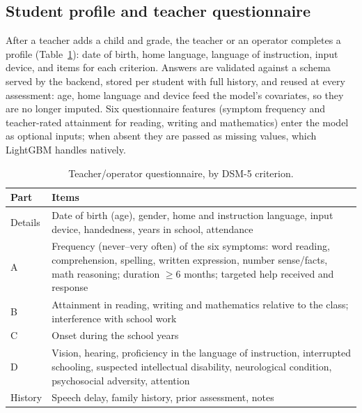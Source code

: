 \documentclass[conference]{IEEEtran}
\begin{document}
\subsection{Student profile and teacher questionnaire}
After a teacher adds a child and grade, the teacher or an operator completes a
profile (Table~\ref{tab:questionnaire}): date of birth, home language, language of
instruction, input device, and items for each criterion. Answers are validated against
a schema served by the backend, stored per student with full history, and reused at
every assessment: age, home language and device feed the model's covariates, so they
are no longer imputed. Six questionnaire features (symptom frequency and teacher-rated
attainment for reading, writing and mathematics) enter the model as optional inputs;
when absent they are passed as missing values, which LightGBM handles natively.

\begin{table}[!t]
\centering
\caption{Teacher/operator questionnaire, by DSM-5 criterion.}
\label{tab:questionnaire}
\footnotesize
\setlength{\tabcolsep}{3pt}
\begin{tabular}{@{}lp{6.6cm}@{}}
\toprule
Part & Items \\
\midrule
Details & Date of birth (age), gender, home and instruction language, input device, handedness, years in school, attendance \\
A & Frequency (never--very often) of the six symptoms: word reading, comprehension, spelling, written expression, number sense/facts, math reasoning; duration $\geq$6 months; targeted help received and response \\
B & Attainment in reading, writing and mathematics relative to the class; interference with school work \\
C & Onset during the school years \\
D & Vision, hearing, proficiency in the language of instruction, interrupted schooling, suspected intellectual disability, neurological condition, psychosocial adversity, attention \\
History & Speech delay, family history, prior assessment, notes \\
\bottomrule
\end{tabular}
\end{table}
\end{document}
